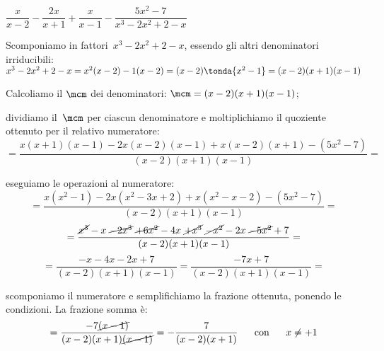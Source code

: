  \begin{esempio}
\(\dfrac{x}{x-2}-\dfrac{2x}{x+1}+
\dfrac{x}{x-1}-\dfrac{5x^{2}-7}{x^{3}-2x^{2}+2-x}\)
\begin{enumeratea}
 \item Scomponiamo in fattori~\(x^{3}-2x^{2}+2-x\), 
  essendo gli altri denominatori irriducibili: 
  \(x^{3}-2x^{2}+2-x=x^2(x-2)-1(x-2)=(x-2) \tonda{x^2-1} =
   (x-2)(x+1)(x-1)\)%

 \item Calcoliamo il \(\mcm\) dei denominatori: 
  \(\mcm=(x-2)(x+1)(x-1)\);
  
 \item dividiamo il~\(\mcm\) per ciascun denominatore e moltiplichiamo il 
  quoziente ottenuto per il relativo numeratore:
 \[=\dfrac{x(x+1)(x-1)-2x(x-2)(x-1)+x(x-2)(x+1)-(5x^{2}-7)}
         {(x-2)(x+1)(x-1)}=\]
 \item eseguiamo le operazioni al numeratore:
\[=\dfrac{x(x^2-1)-2x(x^2-3x+2)+x(x^2-x-2)-(5x^{2}-7)}{(x-2)(x+1)(x-1)} = \]
\[=\dfrac{\cancel{x^3}-x~\cancel{-2x^3}~\cancel{+6x^2}-4x~\cancel{+x^3}
          ~\cancel{-x^2}-2x~\cancel{-5x^2}+7}
         {(x-2)(x+1)(x-1)}=\]
\[=\dfrac{-x-4x-2x+7}{(x-2)(x+1)(x-1)}=\dfrac{-7x+7}{(x-2)(x+1)(x-1)}=\]
 \item scomponiamo il numeratore e semplifichiamo la frazione ottenuta, 
  ponendo le condizioni. La frazione somma è:
\[=\dfrac{-7\cancel{(x-1)}}{(x-2)(x+1)\cancel{(x-1)}}=
   -{\dfrac{7}{(x-2)(x+1)}} \quad  \text{~~con~~} \quad x \neq +1\]
 \end{enumeratea}
 \end{esempio}

